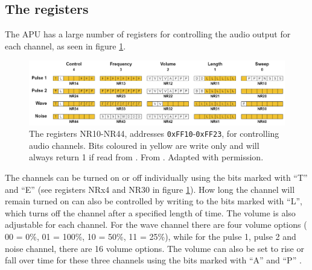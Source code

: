 \subsection{The registers}
    The APU has a large number of registers for controlling the audio output for each channel, as seen in figure \ref{fig:apu_channel_registers}.
        \begin{figure}[H]
            \centering
            \includegraphics[width=\linewidth]{figures/APU/apu_channel_registers.png}
            \caption{The registers NR10-NR44, addresses \texttt{0xFF10}-\texttt{0xFF23}, for controlling audio channels. Bits coloured in yellow are write only and will always return 1 if read from \cite{AudioHardware}. From \cite{ultimateGBtalkSlides}. Adapted with permission. }
            \label{fig:apu_channel_registers}
        \end{figure}
                
The channels can be turned on or off individually using the bits marked with ``T'' and ``E'' (see registers NRx4 and NR30 in figure \ref{fig:apu_channel_registers}). How long the channel will remain turned on can also be controlled by writing to the bits marked with ``L'', which turns off the channel after a specified length of time. The volume is also adjustable for each channel. For the wave channel there are four volume options ( 00 = 0\%, 01 = 100\%, 10 = 50\%, 11 = 25\%), while for the pulse 1, pulse 2 and noise channel, there are 16 volume options. The volume can also be set to rise or fall over time for these three channels using the bits marked with ``A'' and ``P'' \cite{AudioHardware}.\\
                
